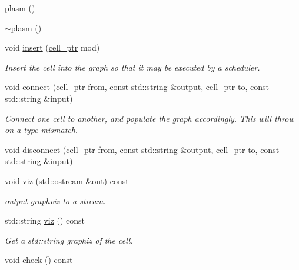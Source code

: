 \begin{DoxyCompactItemize}
\item 
\hyperlink{structecto_1_1plasm_a1d4a2f7e4fa1a4ef839c7ba0316a825c}{plasm} ()
\item 
\hyperlink{structecto_1_1plasm_a3000d2cb042c0875b4d5c38d33763845}{$\sim$plasm} ()
\item 
void \hyperlink{structecto_1_1plasm_a3419c720b1f839cf9b423655cf4de343}{insert} (\hyperlink{namespaceecto_aed1809e82b9229ea81ef9ee3438cf62c}{cell\+\_\+ptr} mod)
\begin{DoxyCompactList}\small\item\em Insert the cell into the graph so that it may be executed by a scheduler. \end{DoxyCompactList}\item 
void \hyperlink{structecto_1_1plasm_a0ca320f5cef8372cfa713fd7991ad3b2}{connect} (\hyperlink{namespaceecto_aed1809e82b9229ea81ef9ee3438cf62c}{cell\+\_\+ptr} from, const std\+::string \&output, \hyperlink{namespaceecto_aed1809e82b9229ea81ef9ee3438cf62c}{cell\+\_\+ptr} to, const std\+::string \&input)
\begin{DoxyCompactList}\small\item\em Connect one cell to another, and populate the graph accordingly. This will throw on a type mismatch. \end{DoxyCompactList}\item 
void \hyperlink{structecto_1_1plasm_a5e187b40ce0a7d7ed9a6859452aed5ca}{disconnect} (\hyperlink{namespaceecto_aed1809e82b9229ea81ef9ee3438cf62c}{cell\+\_\+ptr} from, const std\+::string \&output, \hyperlink{namespaceecto_aed1809e82b9229ea81ef9ee3438cf62c}{cell\+\_\+ptr} to, const std\+::string \&input)
\item 
void \hyperlink{structecto_1_1plasm_a6350e90b6d85a218e7a84183eaed0c18}{viz} (std\+::ostream \&out) const 
\begin{DoxyCompactList}\small\item\em output graphviz to a stream. \end{DoxyCompactList}\item 
std\+::string \hyperlink{structecto_1_1plasm_a4586d90c908123a18dbd3a26c206f63c}{viz} () const 
\begin{DoxyCompactList}\small\item\em Get a std\+::string graphiz of the cell. \end{DoxyCompactList}\item 
void \hyperlink{structecto_1_1plasm_a9554edd5758b8a83ed092a81e249f64a}{check} () const 

\end{DoxyCompactItemize}
